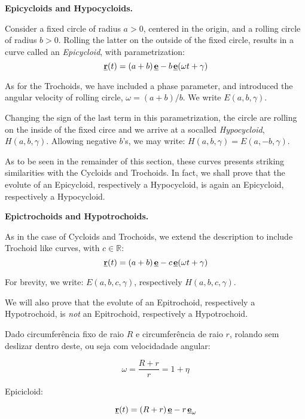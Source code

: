 
\begin{Definition} 
   \textbf{Epicycloids and Hypocycloids.}

   Consider a fixed circle of radius $a>0$, centered in the origin,
   and a rolling circle of radius $b>0$. Rolling the latter on the
   outside of the fixed circle, results in a curve called an
   \emph{Epicycloid}, with parametrization:
\[
 \hspace{0.05cm} \underline{\mathbf{r}}(t)
 =
 (a+b) \hspace{0.05cm} \underline{\mathbf{e}}-b \hspace{0.05cm} \underline{\mathbf{e}}(\omega t+\gamma)
\]

As for the Trochoids, we have included a phase parameter, and introduced
the angular velocity of rolling circle, $\omega=(a+b)/b$. We write $E(a,b,\gamma)$.

Changing the sign of the last term in this parametrization, 
the circle are rolling on the inside of the fixed circe
and we arrive at a socalled \emph{Hypocycloid},
$H(a,b,\gamma)$. Allowing negative $b$'s, we may write:
$H(a,b,\gamma)=E(a,-b,\gamma)$.
\end{Definition}

As to be seen in the remainder of this section, these curves presents
striking similarities with the Cycloids and Trochoids. In fact, we shall
prove that the evolute of an Epicycloid, respectively a Hypocycloid,
is again an Epicycloid, respectively a Hypocycloid. 


\begin{Definition} 
   \textbf{Epictrochoids and Hypotrochoids.}

As in the case of Cycloids and Trochoids, we extend the description to
include Trochoid like curves, with $c \in \mathbb{R}$: 
\[
 \hspace{0.05cm} \underline{\mathbf{r}}(t)
 =
 (a+b) \hspace{0.05cm} \underline{\mathbf{e}}-c \hspace{0.05cm} \underline{\mathbf{e}}(\omega t+\gamma)
\]

For brevity, we write: $E(a,b,c,\gamma)$, respectively $H(a,b,c,\gamma)$.
\end{Definition}

We will also prove that the evolute of an Epitrochoid, respectively a Hypotrochoid,
is \emph{not} an Epitrochoid, respectively a Hypotrochoid. 


\vspace{3cm}

Dado circumferência fixo de raio $R$ e circumferência de raio $r$, rolando sem deslizar dentro deste, ou seja
com velocidadade angular:

\[
  \omega=\frac{R+r}{r}
  =
  1+\eta
\]

Epicicloid:

\[
 \hspace{0.05cm} \underline{\mathbf{r}}(t)
 =
 (R+r) \hspace{0.05cm} \underline{\mathbf{e}}-r \hspace{0.05cm} \underline{\mathbf{e}}_\omega
\]

